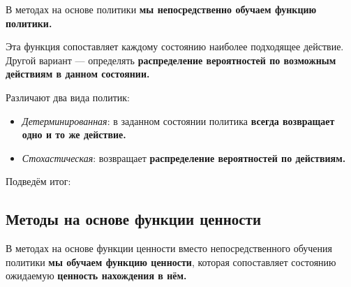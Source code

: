 \documentclass[11pt,a4paper]{article}
\begin{document}
В методах на основе политики \textbf{мы непосредственно обучаем функцию политики.}

Эта функция сопоставляет каждому состоянию наиболее подходящее действие. Другой вариант --- определять \textbf{распределение вероятностей по возможным действиям в данном состоянии.}


Различают два вида политик:

\begin{itemize}
\tightlist
\item
  \emph{Детерминированная}: в заданном состоянии политика \textbf{всегда возвращает одно и то же действие.}
\end{itemize}



\begin{itemize}
\tightlist
\item
  \emph{Стохастическая}: возвращает \textbf{распределение вероятностей по действиям.}
\end{itemize}



Подведём итог:



\subsection{Методы на основе функции ценности}\label{value-based-methods}

В методах на основе функции ценности вместо непосредственного обучения политики \textbf{мы обучаем функцию ценности}, которая сопоставляет состоянию ожидаемую \textbf{ценность нахождения в нём.}
\end{document}
